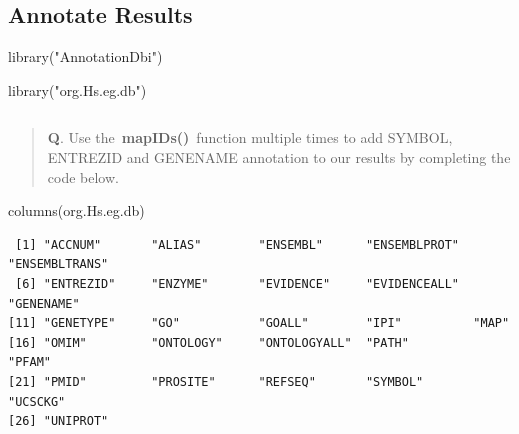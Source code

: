 \documentclass[
  letterpaper,
  DIV=11,
  numbers=noendperiod]{scrartcl}
\newenvironment{Shaded}{\begin{snugshade}}{\end{snugshade}}
\newcommand{\AttributeTok}[1]{\textcolor[rgb]{0.40,0.45,0.13}{#1}}
\newcommand{\FunctionTok}[1]{\textcolor[rgb]{0.28,0.35,0.67}{#1}}
\newcommand{\NormalTok}[1]{\textcolor[rgb]{0.00,0.23,0.31}{#1}}
\newcommand{\OtherTok}[1]{\textcolor[rgb]{0.00,0.23,0.31}{#1}}
\newcommand{\SpecialCharTok}[1]{\textcolor[rgb]{0.37,0.37,0.37}{#1}}
\newcommand{\StringTok}[1]{\textcolor[rgb]{0.13,0.47,0.30}{#1}}
\begin{document}
\hypertarget{annotate-results}{%
\subsection{Annotate Results}\label{annotate-results}}

\begin{Shaded}
\begin{Highlighting}[]
\FunctionTok{library}\NormalTok{(}\StringTok{"AnnotationDbi"}\NormalTok{)}
\end{Highlighting}
\end{Shaded}

\begin{Shaded}
\begin{Highlighting}[]
\FunctionTok{library}\NormalTok{(}\StringTok{"org.Hs.eg.db"}\NormalTok{)}
\end{Highlighting}
\end{Shaded}

\begin{verbatim}
\end{verbatim}

\begin{quote}
\textbf{Q}. Use the~\textbf{mapIDs()}~function multiple times to add
SYMBOL, ENTREZID and GENENAME annotation to our results by completing
the code below.
\end{quote}

\begin{Shaded}
\begin{Highlighting}[]
\FunctionTok{columns}\NormalTok{(org.Hs.eg.db)}
\end{Highlighting}
\end{Shaded}

\begin{verbatim}
 [1] "ACCNUM"       "ALIAS"        "ENSEMBL"      "ENSEMBLPROT"  "ENSEMBLTRANS"
 [6] "ENTREZID"     "ENZYME"       "EVIDENCE"     "EVIDENCEALL"  "GENENAME"    
[11] "GENETYPE"     "GO"           "GOALL"        "IPI"          "MAP"         
[16] "OMIM"         "ONTOLOGY"     "ONTOLOGYALL"  "PATH"         "PFAM"        
[21] "PMID"         "PROSITE"      "REFSEQ"       "SYMBOL"       "UCSCKG"      
[26] "UNIPROT"     
\end{verbatim}

\begin{Shaded}
\end{Shaded}
\end{document}
